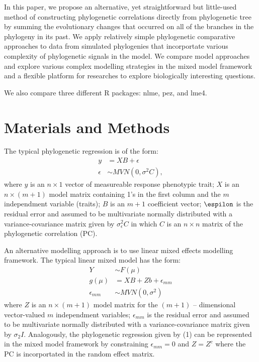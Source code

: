 \documentclass[12pt]{article}
\begin{document}
In this paper, we propose an alternative, yet straightforward but little-used method of constructing phylogenetic correlations directly from phylogenetic tree by summing the evolutionary changes that occurred on all of the branches in the phylogeny in its past.
We apply relatively simple phylogenetic comparative approaches to data from simulated phylogenies that incorportate various complexity of phylogenetic signals in the model. 
We compare model approaches and explore various complex modelling strategies in the mixed model framework and a flexible platform for researches to explore biologically interesting questions.

We also compare three different R packages: nlme, pez, and lme4. 

\section{Materials and Methods}

The typical phylogenetic regression is of the form:
\begin{align}
y & = XB + \epsilon \\
\epsilon & \sim MVN(0,\sigma^{2}C),
\label{eq:gls}
\end{align}
where $y$ is an $n \times 1$ vector of measureable response phenotypic trait; $X$ is an $n \times (m + 1)$ model matrix containing 1's in the first column and the $m$ independment variable (traits); $B$ is an $m + 1$ coefficient vector; $\espilon$ is the residual error and assumed to be multivariate normally distributed with a variance-covariance matrix given by $\sigma^{2}_{ \epsilon} C$ in which $C$ is an $n \times n$ matrix of the phylogenetic correlation (PC).

An alternative modelling approach is to use linear mixed effects modelling framework.
The typical linear mixed model has the form:
\begin{align}
Y & \sim F(\mu) \\
g(\mu) & = XB + Zb + \epsilon_{mm} \\
\epsilon_{mm} & \sim MVN(0,\sigma^2)
\end{align}
where $Z$ is an $n \times (m+1)$ model matrix for the $(m+1)$ -- dimensional vector-valued $m$ independment variables; $\epsilon_{mm}$ is the residual error and assumed to be multivariate normally distributed with a variance-covariance matrix given by $\sigma_{2}I$.
Analogously, the phylogenetic regression given by (1) can be represented in the mixed model framework by constraining $\epsilon_{mm} = 0$ and $Z=Z^{c}$ where the PC is incorportated in the random effect matrix. 
\end{document}
